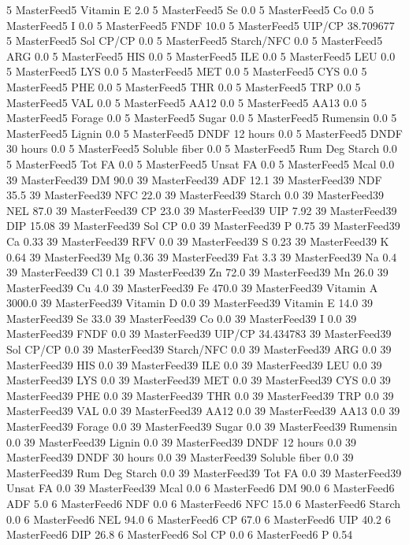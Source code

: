 \documentclass[letterpaper,10pt,english]{sphinxmanual}
\begin{document}
\begin{sphinxVerbatim}[commandchars=\\\{\},numbers=left,firstnumber=1,stepnumber=1]
5 MasterFeed5 Vitamin E 2.0
5 MasterFeed5 Se 0.0
5 MasterFeed5 Co 0.0
5 MasterFeed5 I 0.0
5 MasterFeed5 FNDF 10.0
5 MasterFeed5 UIP/CP 38.709677
5 MasterFeed5 Sol CP/CP 0.0
5 MasterFeed5 Starch/NFC 0.0
5 MasterFeed5 ARG 0.0
5 MasterFeed5 HIS 0.0
5 MasterFeed5 ILE 0.0
5 MasterFeed5 LEU 0.0
5 MasterFeed5 LYS 0.0
5 MasterFeed5 MET 0.0
5 MasterFeed5 CYS 0.0
5 MasterFeed5 PHE 0.0
5 MasterFeed5 THR 0.0
5 MasterFeed5 TRP 0.0
5 MasterFeed5 VAL 0.0
5 MasterFeed5 AA\PYGZsh{}12 0.0
5 MasterFeed5 AA\PYGZsh{}13 0.0
5 MasterFeed5 \PYGZpc{} Forage 0.0
5 MasterFeed5 Sugar \PYGZpc{} 0.0
5 MasterFeed5 Rumensin 0.0
5 MasterFeed5 Lignin 0.0
5 MasterFeed5 DNDF 12 hours 0.0
5 MasterFeed5 DNDF 30 hours 0.0
5 MasterFeed5 Soluble fiber 0.0
5 MasterFeed5 Rum Deg Starch 0.0
5 MasterFeed5 Tot FA 0.0
5 MasterFeed5 Unsat FA 0.0
5 MasterFeed5 Mcal 0.0
39 MasterFeed39 DM 90.0
39 MasterFeed39 ADF 12.1
39 MasterFeed39 NDF 35.5
39 MasterFeed39 NFC 22.0
39 MasterFeed39 Starch 0.0
39 MasterFeed39 NEL 87.0
39 MasterFeed39 CP 23.0
39 MasterFeed39 UIP 7.92
39 MasterFeed39 DIP 15.08
39 MasterFeed39 Sol CP 0.0
39 MasterFeed39 P 0.75
39 MasterFeed39 Ca 0.33
39 MasterFeed39 RFV 0.0
39 MasterFeed39 S 0.23
39 MasterFeed39 K 0.64
39 MasterFeed39 Mg 0.36
39 MasterFeed39 Fat 3.3
39 MasterFeed39 Na 0.4
39 MasterFeed39 Cl 0.1
39 MasterFeed39 Zn 72.0
39 MasterFeed39 Mn 26.0
39 MasterFeed39 Cu 4.0
39 MasterFeed39 Fe 470.0
39 MasterFeed39 Vitamin A 3000.0
39 MasterFeed39 Vitamin D 0.0
39 MasterFeed39 Vitamin E 14.0
39 MasterFeed39 Se 33.0
39 MasterFeed39 Co 0.0
39 MasterFeed39 I 0.0
39 MasterFeed39 FNDF 0.0
39 MasterFeed39 UIP/CP 34.434783
39 MasterFeed39 Sol CP/CP 0.0
39 MasterFeed39 Starch/NFC 0.0
39 MasterFeed39 ARG 0.0
39 MasterFeed39 HIS 0.0
39 MasterFeed39 ILE 0.0
39 MasterFeed39 LEU 0.0
39 MasterFeed39 LYS 0.0
39 MasterFeed39 MET 0.0
39 MasterFeed39 CYS 0.0
39 MasterFeed39 PHE 0.0
39 MasterFeed39 THR 0.0
39 MasterFeed39 TRP 0.0
39 MasterFeed39 VAL 0.0
39 MasterFeed39 AA\PYGZsh{}12 0.0
39 MasterFeed39 AA\PYGZsh{}13 0.0
39 MasterFeed39 \PYGZpc{} Forage 0.0
39 MasterFeed39 Sugar \PYGZpc{} 0.0
39 MasterFeed39 Rumensin 0.0
39 MasterFeed39 Lignin 0.0
39 MasterFeed39 DNDF 12 hours 0.0
39 MasterFeed39 DNDF 30 hours 0.0
39 MasterFeed39 Soluble fiber 0.0
39 MasterFeed39 Rum Deg Starch 0.0
39 MasterFeed39 Tot FA 0.0
39 MasterFeed39 Unsat FA 0.0
39 MasterFeed39 Mcal 0.0
6 MasterFeed6 DM 90.0
6 MasterFeed6 ADF 5.0
6 MasterFeed6 NDF 0.0
6 MasterFeed6 NFC 15.0
6 MasterFeed6 Starch 0.0
6 MasterFeed6 NEL 94.0
6 MasterFeed6 CP 67.0
6 MasterFeed6 UIP 40.2
6 MasterFeed6 DIP 26.8
6 MasterFeed6 Sol CP 0.0
6 MasterFeed6 P 0.54

\end{sphinxVerbatim}
\end{document}
